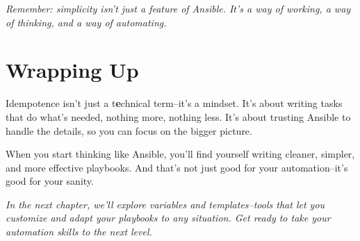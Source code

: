 \textit{Remember: simplicity isn't just a feature of Ansible. It's a way of working, a way of thinking, and a way of automating.}

\section{Wrapping Up}

Idempotence isn't just a t\textbf{e}chnical term--it's a mindset. It's about writing tasks that do what's needed, nothing more, nothing less. It's about trusting Ansible to handle the details, so you can focus on the bigger picture.

When you start thinking like Ansible, you'll find yourself writing cleaner, simpler, and more effective playbooks. And that's not just good for your automation--it's good for your sanity.

\vspace{1em}


\textit{In the next chapter, we'll explore variables and templates--tools that let you customize and adapt your playbooks to any situation. Get ready to take your automation skills to the next level.}
